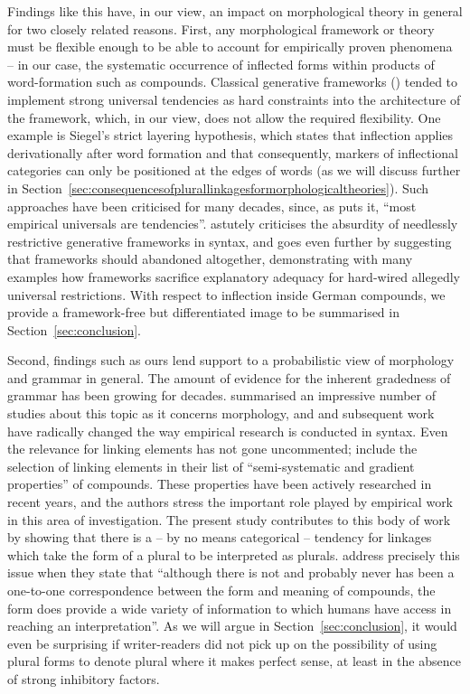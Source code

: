 Findings like this have, in our view, an impact on morphological theory in general for two closely related reasons.
First, any morphological framework or theory must be flexible enough to be able to account for empirically proven phenomena -- in our case, the systematic occurrence of inflected forms within products of word-formation such as compounds.
Classical generative frameworks (\egg \citealt{Siegel1979,Mohanan1986,Anderson1992,Pinker1999}) tended to implement strong universal tendencies as hard constraints into the architecture of the framework, which, in our view, does not allow the required flexibility.
One example is Siegel's strict layering hypothesis, which states that inflection applies derivationally after word formation and that consequently, markers of inflectional categories can only be positioned at the edges of words (as we will discuss further in Section~\ref{sec:consequencesofplurallinkagesformorphologicaltheories}).
Such approaches have been criticised for many decades, since, as \textcite[391]{Haspelmath2010} puts it, ``most empirical universals are tendencies''.
\textcite{Pollard1996} astutely criticises the absurdity of needlessly restrictive generative frameworks in syntax, and \textcite{Haspelmath2010} goes even further by suggesting that frameworks should abandoned altogether, demonstrating with many examples how frameworks sacrifice explanatory adequacy for hard-wired allegedly universal restrictions.
With respect to inflection inside German compounds, we provide a framework-free but differentiated image to be summarised in Section~\ref{sec:conclusion}.

Second, findings such as ours lend support to a probabilistic view of morphology and grammar in general.
The amount of evidence for the inherent gradedness of grammar has been growing for decades.
\textcite{HayBaayen2005} summarised an impressive number of studies about this topic as it concerns morphology, and \textcite{Bresnan2007} and subsequent work have radically changed the way empirical research is conducted in syntax.
Even the relevance for linking elements has not gone uncommented; \textcite[105]{ArndtlappeEa2016} include the selection of linking elements in their list of ``semi-systematic and gradient properties'' of compounds.
These properties have been actively researched in recent years, and the authors stress the important role played by empirical work in this area of investigation.
The present study contributes to this body of work by showing that there is a -- by no means categorical -- tendency for linkages which take the form of a plural to be interpreted as plurals.
\textcite[107]{ArndtlappeEa2016} address precisely this issue when they state that ``although there is not and probably never has been a one-to-one correspondence between the form and meaning of compounds, the form does provide a wide variety of information to which humans have access in reaching an interpretation''.
As we will argue in Section~\ref{sec:conclusion}, it would even be surprising if writer-readers did not pick up on the possibility of using plural forms to denote plural where it makes perfect sense, at least in the absence of strong inhibitory factors.


